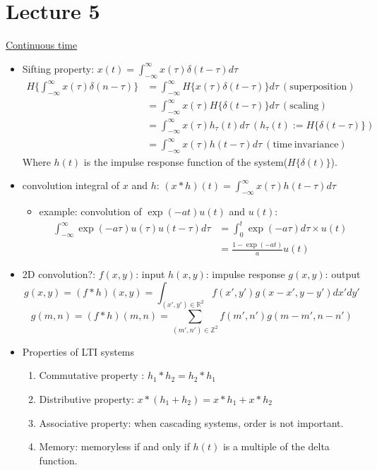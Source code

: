 \documentclass{article}
\begin{document}
\section{Lecture 5}
\underline{Continuous time}
\begin{itemize}
\item
Sifting property: $x(t) = \displaystyle\int_{-\infty}^{\infty}{x(\tau)\delta(t-\tau)d\tau}$
\begin{align*}
  H\{\int_{-\infty}^{\infty}{x(\tau)\delta(n-\tau)}\} &= \int_{-\infty}^{\infty}{H\{x(\tau)\delta(t-\tau)\}d\tau}\:(\mathrm{superposition})\\
  &= \int_{-\infty}^{\infty}x(\tau)H\{\delta(t-\tau)\}d\tau\:(\mathrm{scaling})\\ 
  &= \int_{-\infty}^{\infty}x(\tau)h_\tau(t)d\tau \:(h_\tau(t) := H\{\delta(t-\tau)\})\\
  &= \int_{-\infty}^{\infty}{x(\tau)h(t-\tau)d\tau}\:(\mathrm{time\: invariance})
\end{align*}
Where $h(t)$ is the impulse response function of the system($H\{\delta(t)\}$).

\item convolution integral of $x$ and $h$: $(x*h)(t) = \displaystyle\int_{-\infty}^{\infty}{x(\tau)h(t-\tau)d\tau}$
\begin{itemize}
\item example: convolution of $\exp(-at)u(t)$ and $u(t)$:\\
\begin{align*}\int_{-\infty}^{\infty}{\exp(-a\tau)u(\tau)u(t-\tau)d\tau}
  &= \int_{0}^{t}{\exp(-a\tau)d\tau}\times u(t)\\
  &= \frac{1-\exp(-at)}{a}u(t)
\end{align*}
\end{itemize}
\item 2D convolution?: $f(x, y)$: input $h(x, y)$: impulse response $g(x, y)$: output
\[
g(x, y) = (f * h)(x, y) = \int_{(x', y') \in \mathbb{R}^2}{f(x', y')g(x - x', y - y')dx'dy'}
\]
\[
g(m, n) = (f * h)(m, n) = \sum_{(m', n') \in \mathbb{Z}^2}{f(m', n')g(m - m', n - n')}
\]
\item Properties of LTI systems
\begin{enumerate}
\item Commutative property : $h_1*h_2=h_2*h_1$
\item Distributive property: $x*(h_1+h_2)=x*h_1+x*h_2$
\item Associative property: when cascading systems, order is not important.
\item Memory: memoryless if and only if $h(t)$ is a multiple of the delta function.


\end{enumerate}
\end{itemize}
\end{document}
